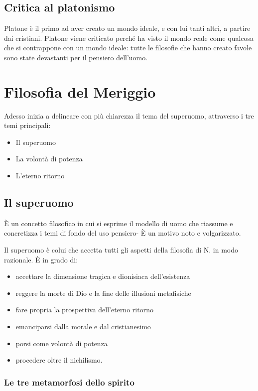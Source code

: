 \documentclass[a4paper, twoside, titlepage]{book}
\begin{document}
\section{Critica al platonismo}

Platone è il primo ad aver creato un mondo ideale, e con lui tanti altri, a partire dai cristiani.
Platone viene criticato perché ha visto il mondo reale come qualcosa che si contrappone con un mondo ideale: tutte le filosofie che hanno creato favole sono state devastanti per il pensiero dell'uomo.

\chapter{Filosofia del Meriggio}

Adesso inizia a delineare con più chiarezza il tema del superuomo, attraverso i tre temi principali:
\begin{itemize}
\item Il superuomo
\item La volontà di potenza
\item L'eterno ritorno
\end{itemize}

\section{Il superuomo}

È un concetto filosofico in cui si esprime il modello di uomo che riassume e concretizza i temi di fondo del uso pensiero-
È un motivo noto e volgarizzato.

Il superuomo è colui che accetta tutti gli aspetti della filosofia di N. in modo razionale. È in grado di:
\begin{itemize}
\item accettare la dimensione tragica e dionisiaca dell'esistenza
\item reggere la morte di Dio e la fine delle illusioni metafisiche
\item fare propria la prospettiva dell'eterno ritorno
\item emanciparsi dalla morale e dal cristianesimo
\item porsi come volontà di potenza
\item procedere oltre il nichilismo.
\end{itemize}

\subsection{Le tre metamorfosi dello spirito}
\end{document}
